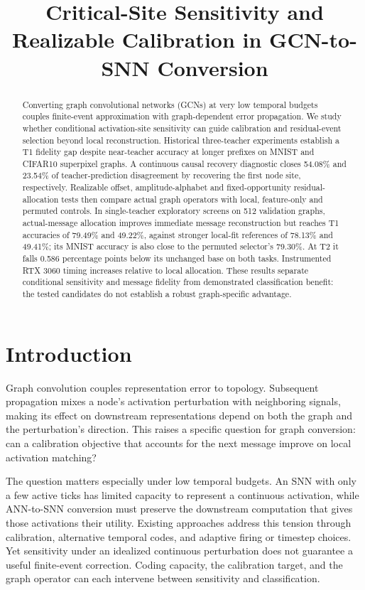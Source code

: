 \documentclass[11pt]{article}
\title{Critical-Site Sensitivity and Realizable Calibration in GCN-to-SNN Conversion}
\author{}
\date{}
\begin{document}
\maketitle

\begin{abstract}

Converting graph convolutional networks (GCNs) at very low temporal budgets couples finite-event approximation with graph-dependent error propagation. We study whether conditional activation-site sensitivity can guide calibration and residual-event selection beyond local reconstruction. Historical three-teacher experiments establish a T1 fidelity gap despite near-teacher accuracy at longer prefixes on MNIST and CIFAR10 superpixel graphs. A continuous causal recovery diagnostic closes 54.08\% and 23.54\% of teacher-prediction disagreement by recovering the first node site, respectively. Realizable offset, amplitude-alphabet and fixed-opportunity residual-allocation tests then compare actual graph operators with local, feature-only and permuted controls. In single-teacher exploratory screens on 512 validation graphs, actual-message allocation improves immediate message reconstruction but reaches T1 accuracies of 79.49\% and 49.22\%, against stronger local-fit references of 78.13\% and 49.41\%; its MNIST accuracy is also close to the permuted selector's 79.30\%. At T2 it falls 0.586 percentage points below its unchanged base on both tasks. Instrumented RTX 3060 timing increases relative to local allocation. These results separate conditional sensitivity and message fidelity from demonstrated classification benefit: the tested candidates do not establish a robust graph-specific advantage.

\end{abstract}

\section{Introduction}

Graph convolution couples representation error to topology. Subsequent propagation mixes a node's activation perturbation with neighboring signals, making its effect on downstream representations depend on both the graph and the perturbation's direction. This raises a specific question for graph conversion: can a calibration objective that accounts for the next message improve on local activation matching?

The question matters especially under low temporal budgets. An SNN with only a few active ticks has limited capacity to represent a continuous activation, while ANN-to-SNN conversion must preserve the downstream computation that gives those activations their utility. Existing approaches address this tension through calibration, alternative temporal codes, and adaptive firing or timestep choices. Yet sensitivity under an idealized continuous perturbation does not guarantee a useful finite-event correction. Coding capacity, the calibration target, and the graph operator can each intervene between sensitivity and classification.
\end{document}
